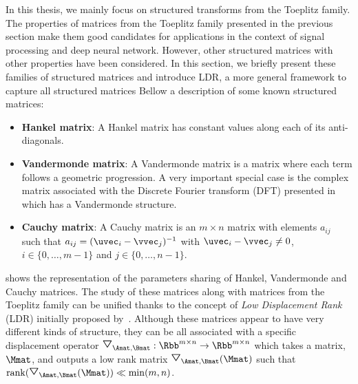 In this thesis, we mainly focus on structured transforms from the Toeplitz family.
The properties of matrices from the Toeplitz family presented in the previous section make them good candidates for applications in the context of signal processing and deep neural network.
However, other structured matrices with other properties have been considered.
In this section, we briefly present these families of structured matrices and introduce LDR, a more general framework to capture all structured matrices
Bellow a description of some known structured matrices: 
\begin{itemize}
  \item \textbf{Hankel matrix}: A Hankel matrix has constant values along each of its anti-diagonals.
  \item \textbf{Vandermonde matrix}: A Vandermonde matrix is a matrix where each term follows a geometric progression.
    A very important special case is the complex matrix associated with the Discrete Fourier transform (DFT) presented in  which has a Vandermonde structure.
  \item \textbf{Cauchy matrix}: A Cauchy matrix is an $m \times n$ matrix with elements $a_{ij}$ such that $a_{ij} = (\uvec_i - \vvec_j)^{-1}$ with $\uvec_i - \vvec_j \neq 0$, $i \in \{0,\dots,m-1\}$ and $j \in \{0,\dots,n-1\}$.
\end{itemize}
 shows the representation of the parameters sharing of Hankel, Vandermonde and Cauchy matrices.
The study of these matrices along with matrices from the Toeplitz family can be unified thanks to the concept of \emph{Low Displacement Rank} (LDR) initially proposed by~\citet{kailath1979displacement}.
Although these matrices appear to have very different kinds of structure, they can be all associated with a specific displacement operator $\triangleopdown_{\Amat, \Bmat}: \Rbb^{m \times n} \rightarrow \Rbb^{m \times n}$ which takes a matrix, $\Mmat$, and outputs a low rank matrix $\triangleopdown_{\Amat, \Bmat}(\Mmat)$ such that $\rank(\triangleopdown_{\Amat, \Bmat}(\Mmat)) \ll \min(m,n)$.



